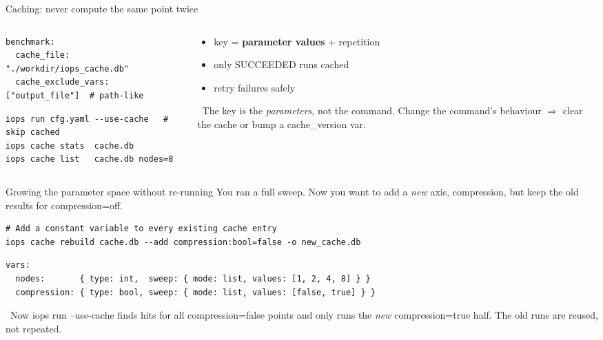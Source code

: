 \documentclass[aspectratio=169,11pt]{beamer}
\newcommand{\code}[1]{{\ttfamily\small\color{iopsNavy}#1}}
\newcommand{\hl}[1]{{\color{iopsPink}\bfseries #1}}
\begin{document}
\begin{frame}[fragile]{Caching: never compute the same point twice}
  \begin{columns}[T]
    \begin{column}{0.55\textwidth}
\begin{lstlisting}[style=yaml]
benchmark:
  cache_file: "./workdir/iops_cache.db"
  cache_exclude_vars: ["output_file"]  # path-like
\end{lstlisting}
\begin{lstlisting}[style=sh]
iops run cfg.yaml --use-cache   # skip cached
iops cache stats  cache.db
iops cache list   cache.db nodes=8
\end{lstlisting}
    \end{column}
    \begin{column}{0.45\textwidth}
      \begin{itemize}
        \item key = \hl{parameter values} + repetition
        \item only \code{SUCCEEDED} runs cached
        \item retry failures safely
      \end{itemize}
      \begin{keybox}[colback=iopsPink!8, colframe=iopsPink]
        \faExclamationTriangle~The key is the \emph{parameters}, not the
        command. Change the command's behaviour $\Rightarrow$ clear the cache or
        bump a \code{cache\_version} var.
      \end{keybox}
    \end{column}
  \end{columns}
\end{frame}



\begin{frame}[fragile]{Growing the parameter space without re-running}
  You ran a full sweep. Now you want to add a \emph{new} axis,
  \code{compression}, but keep the old results for \code{compression=off}.
\begin{lstlisting}[style=sh,basicstyle=\ttfamily\scriptsize]
# Add a constant variable to every existing cache entry
iops cache rebuild cache.db --add compression:bool=false -o new_cache.db
\end{lstlisting}
\begin{lstlisting}[style=yaml]
vars:
  nodes:       { type: int,  sweep: { mode: list, values: [1, 2, 4, 8] } }
  compression: { type: bool, sweep: { mode: list, values: [false, true] } }
\end{lstlisting}
  \begin{keybox}[colback=iopsGreen!10, colframe=iopsGreen]
    \faMagic~Now \code{iops run --use-cache} finds hits for all
    \code{compression=false} points and only runs the \emph{new}
    \code{compression=true} half. The old runs are reused, not repeated.
  \end{keybox}
\end{frame}
\end{document}
